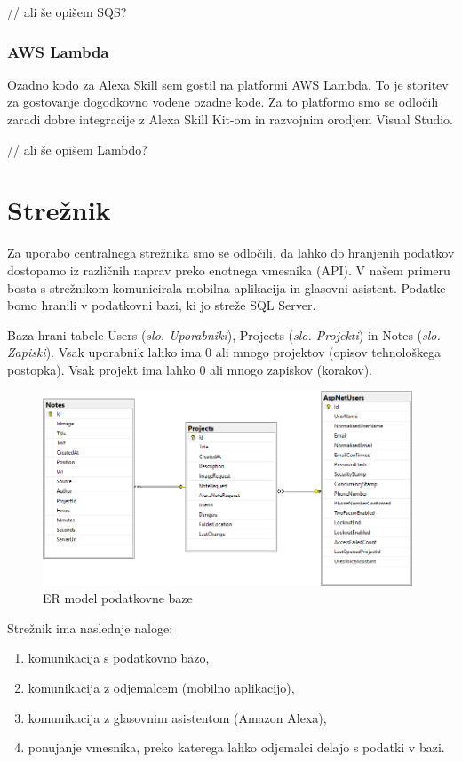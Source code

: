 \documentclass[a4paper, 12pt]{book}
\begin{document}
// ali še opišem SQS?

\subsubsection{AWS Lambda}

Ozadno kodo za Alexa Skill sem gostil na platformi AWS Lambda.
To je storitev za gostovanje dogodkovno vodene ozadne kode.
Za to platformo smo se odločili zaradi dobre integracije z Alexa Skill Kit-om in razvojnim orodjem Visual Studio.

// ali še opišem Lambdo?


\section{Strežnik}

Za uporabo centralnega strežnika smo se odločili, da lahko do hranjenih podatkov dostopamo iz različnih naprav preko enotnega vmesnika (API).
V našem primeru bosta s strežnikom komunicirala mobilna aplikacija in glasovni asistent.
Podatke bomo hranili v podatkovni bazi, ki jo streže SQL Server.

Baza hrani tabele Users (\textit{slo. Uporabniki}), Projects (\textit{slo. Projekti}) in Notes (\textit{slo. Zapiski}).
Vsak uporabnik lahko ima 0 ali mnogo projektov (opisov tehnološkega postopka).
Vsak projekt ima lahko 0 ali mnogo zapiskov (korakov).

\begin{figure}[H]
\begin{center}
\includegraphics[width=11cm]{er_diagram_small}
\end{center}
\caption{ER model podatkovne baze}
\label{er_diagram}
\end{figure}


\noindent Strežnik ima naslednje naloge:
\begin{enumerate}
	\item komunikacija s podatkovno bazo,
	\item komunikacija z odjemalcem (mobilno aplikacijo),
	\item komunikacija z glasovnim asistentom (Amazon Alexa),
	\item ponujanje vmesnika, preko katerega lahko odjemalci delajo s podatki v bazi.
\end{enumerate}
\end{document}
